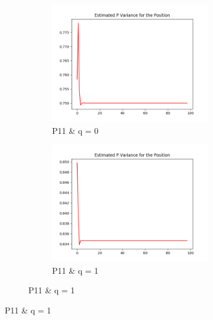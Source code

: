 \documentclass{article}
\begin{document}
        \begin{figure}[H]
            \centering 
            \begin{subfigure}{1\textwidth}  
                \begin{subfigure}{.3\textwidth}  
                    \includegraphics[width=1\linewidth]{./img/p11_qf1.png}
                    \caption{P11 \& q = 0 }
                \end{subfigure}
                \begin{subfigure}{.3\textwidth}  
                    \includegraphics[width=1\linewidth]{./img/p11_qf3.png}
                    \caption{P11 \& q = 1 }
                \end{subfigure}

\end{subfigure}
\end{figure}
\end{document}
